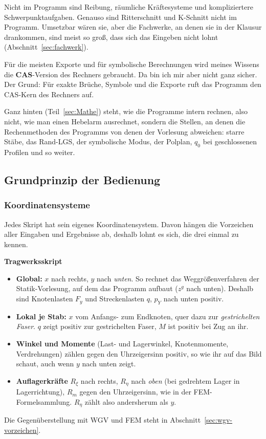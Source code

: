 Nicht im Programm sind Reibung, räumliche Kräftesysteme und kompliziertere Schwerpunktaufgaben.
Genauso sind Ritterschnitt und K-Schnitt nicht im Programm. Umsetzbar wären sie, aber die
Fachwerke, an denen sie in der Klausur drankommen, sind meist so groß, dass sich das Eingeben nicht
lohnt (Abschnitt~\ref{sec:fachwerk}).

Für die meisten Exporte und für symbolische Berechnungen wird meines Wissens die
\textbf{CAS}-Version des Rechners gebraucht. Da bin ich mir aber nicht ganz sicher. Der Grund:
Für exakte Brüche, Symbole und die Exporte ruft das Programm den CAS-Kern des Rechners auf.

Ganz hinten (Teil~\ref{sec:Mathe}) steht, wie die Programme intern rechnen, also nicht, wie man
einen Hebelarm ausrechnet, sondern die Stellen, an denen die Rechenmethoden des Programms von denen der Vorlesung abweichen:
starre Stäbe, das Rand-LGS, der symbolische Modus, der Polplan, $q_0$ bei geschlossenen Profilen
und so weiter.



\subsection{Grundprinzip der Bedienung}

\subsubsection{Koordinatensysteme}\label{sec:kos}

Jedes Skript hat sein eigenes Koordinatensystem. Davon hängen die Vorzeichen aller Eingaben und
Ergebnisse ab, deshalb lohnt es sich, die drei einmal zu kennen.

\textbf{Tragwerksskript}
\begin{itemize}
  \item \textbf{Global:} $x$ nach rechts, $y$ nach \emph{unten}. So rechnet das Weggrößenverfahren
        der Statik-Vorlesung, auf dem das Programm aufbaut ($z^g$ nach unten). Deshalb sind
        Knotenlasten $F_y$ und Streckenlasten $q$, $p_Y$ nach unten positiv.
  \item \textbf{Lokal je Stab:} $x$ vom Anfangs- zum Endknoten, quer dazu zur \emph{gestrichelten
        Faser}. $q$ zeigt positiv zur gestrichelten Faser, $M$ ist positiv bei Zug an ihr.
  \item \textbf{Winkel und Momente} (Last- und Lagerwinkel, Knotenmomente, Verdrehungen) zählen
        gegen den Uhrzeigersinn positiv, so wie ihr auf das Bild schaut, auch wenn $y$ nach unten
        zeigt.
  \item \textbf{Auflagerkräfte} $R_\xi$ nach rechts, $R_\eta$ nach \emph{oben} (bei gedrehtem
        Lager in Lagerrichtung), $R_m$ gegen den Uhrzeigersinn, wie in der FEM-Formelsammlung.
        $R_\eta$ zählt also andersherum als $y$.
\end{itemize}
Die Gegenüberstellung mit WGV und FEM steht in Abschnitt~\ref{sec:wgv-vorzeichen}.

